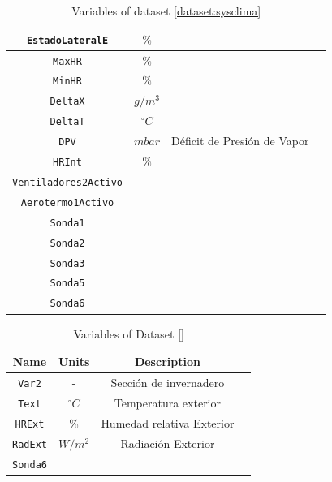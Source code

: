 \begin{table}
\begin{tabular}{|c|c|c|c|}
        \texttt{EstadoLateralE}     & $\%$           & \\ \hline
        \texttt{MaxHR}              & $\%$           & \\ \hline
        \texttt{MinHR}              & $\%$           & \\ \hline
        \texttt{DeltaX}             & $g/m^3$        & \\ \hline
        \texttt{DeltaT}             & $^\circ C$     &  \\ \hline
        \texttt{DPV}                & $mbar$         & Déficit de Presión de Vapor \\  \hline
        \texttt{HRInt}              & $\%$           &  \\ \hline
        \texttt{Ventiladores2Activo}& &  \\ \hline
        \texttt{Aerotermo1Activo} & &\\ \hline
        \texttt{Sonda1} & & \\ \hline
        \texttt{Sonda2} & & \\ \hline
        \texttt{Sonda3} & & \\ \hline
        \texttt{Sonda5} & & \\ \hline
        \texttt{Sonda6} & & \\
        \hline
    \end{tabular}
    \caption{Variables of dataset \ref{dataset:sysclima}}
    \label{table:SysClimaDS}
\end{table}



\begin{table}
    \centering
    \begin{tabular}{|c|c|c|c|}
        \hline
        \textbf{Name}           & \textbf{Units} & \textbf{Description}         \\ \hline
        \texttt{Var2}           & -              & Sección de invernadero       \\ \hline
        \texttt{Text}           & $^\circ C$     & Temperatura exterior         \\ \hline
        \texttt{HRExt}          & \%             & Humedad relativa Exterior    \\ \hline
        \texttt{RadExt}         & $W/m^2$        & Radiación Exterior           \\ \hline
        \texttt{Sonda6} \\
        \hline
    \end{tabular}
    \caption{Variables of Dataset \ref{}}
    \label{table:Euskalmet}
\end{table}


